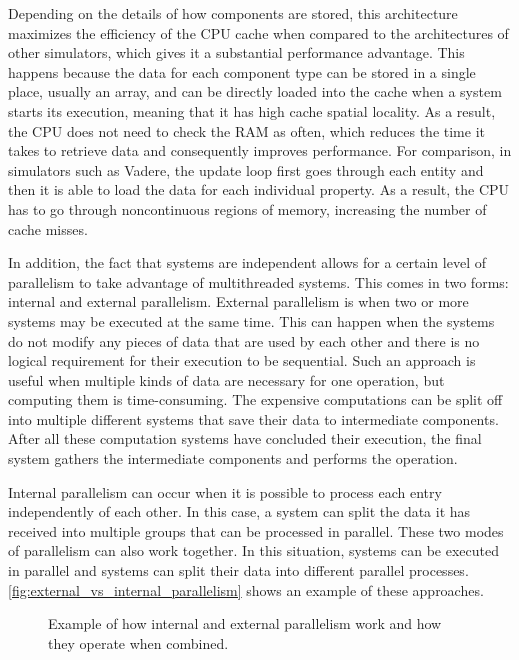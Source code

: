 \documentclass[twoside, 11pt]{article}
\begin{document}
Depending on the details of how components are stored, this architecture maximizes the efficiency of the CPU cache when compared to the architectures of other simulators, which gives it a substantial performance advantage. This happens because the data for each component type can be stored in a single place, usually an array, and can be directly loaded into the cache when a system starts its execution, meaning that it has high cache spatial locality. As a result, the CPU does not need to check the RAM as often, which reduces the time it takes to retrieve data and consequently improves performance. For comparison, in simulators such as Vadere, the update loop first goes through each entity and then it is able to load the data for each individual property. As a result, the CPU has to go through noncontinuous regions of memory, increasing the number of cache misses.

In addition, the fact that systems are independent allows for a certain level of parallelism to take advantage of multithreaded systems. This comes in two forms: internal and external parallelism. External parallelism is when two or more systems may be executed at the same time. This can happen when the systems do not modify any pieces of data that are used by each other and there is no logical requirement for their execution to be sequential. Such an approach is useful when multiple kinds of data are necessary for one operation, but computing them is time-consuming. The expensive computations can be split off into multiple different systems that save their data to intermediate components. After all these computation systems have concluded their execution, the final system gathers the intermediate components and performs the operation. 

Internal parallelism can occur when it is possible to process each entry independently of each other. In this case, a system can split the data it has received into multiple groups that can be processed in parallel. These two modes of parallelism can also work together. In this situation, systems can be executed in parallel and systems can split their data into different parallel processes. \autoref{fig:external_vs_internal_parallelism} shows an example of these approaches.

\begin{figure}
  \centering
  
  \caption[External and internal parallelism comparison]{Example of how internal and external parallelism work and how they operate when combined.}
  \label{fig:external_vs_internal_parallelism}
\end{figure}
\end{document}

